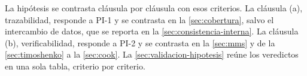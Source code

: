 La hipótesis se contrasta cláusula por cláusula con esos criterios. La cláusula (a), trazabilidad, responde a PI-1 y se contrasta en la \autoref{sec:cobertura}, salvo el intercambio de datos, que se reporta en la \autoref{sec:consistencia-interna}. La cláusula (b), verificabilidad, responde a PI-2 y se contrasta en la \autoref{sec:mms} y de la \autoref{sec:timoshenko} a la \autoref{sec:cook}. La \autoref{sec:validacion-hipotesis} reúne los veredictos en una sola tabla, criterio por criterio.
